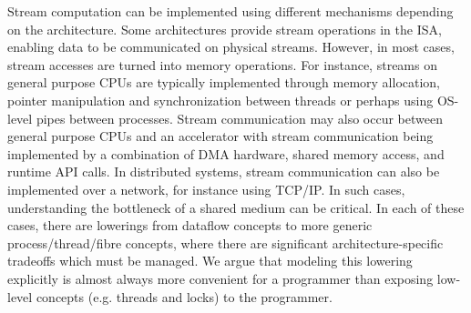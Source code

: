 \documentclass{tufte-handout}
\begin{document}
Stream computation can be implemented using different mechanisms depending on the architecture. Some architectures provide stream operations in the ISA, enabling data to be communicated on physical streams. However, in most cases, stream accesses are turned into memory operations.  For instance, streams on general purpose CPUs are typically implemented through memory allocation, pointer manipulation and synchronization between threads or perhaps using OS-level pipes between processes.  Stream communication may also occur between general purpose CPUs and an accelerator with stream communication being implemented by a combination of DMA hardware, shared memory access, and runtime API calls.  In distributed systems, stream communication can also be implemented over a network, for instance using TCP/IP.  In such cases, understanding the bottleneck of a shared medium can be critical.  In each of these cases, there are lowerings from dataflow concepts to more generic process/thread/fibre concepts, where there are significant architecture-specific tradeoffs which must be managed.  We argue that modeling this lowering explicitly is almost always more convenient for a programmer than exposing low-level concepts (e.g. threads and locks) to the programmer.



\subsection{}


%

\end{document}
